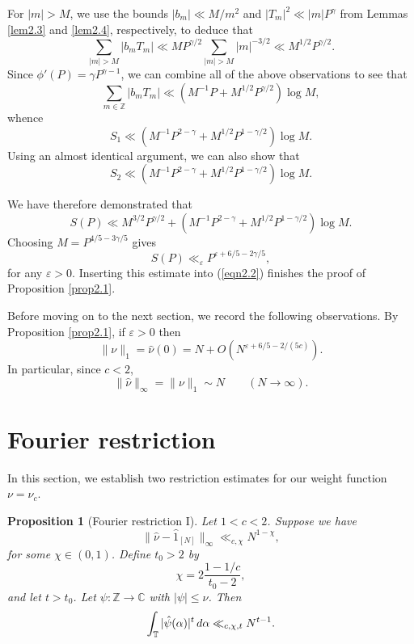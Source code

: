 \documentclass[12pt, reqno]{amsart}
\newtheorem{prop}[thm]{Proposition}
\theoremstyle{definition}
\theoremstyle{remark}
\numberwithin{equation}{section}
\theoremstyle{definition}
\def\alp{{\alpha}} \def\bfalp{{\boldsymbol \alpha}}
\def\gam{{\gamma}} \def\Gam{{\Gamma}}
\def\eps{\varepsilon}
\def\le{\leqslant} \def\ge{\geqslant} \def\pleq{\preccurlyeq} \def\ple{\prec}
\def\d{{\,{\rm d}}}
\def \bC {\mathbb C}
\def \bZ {\mathbb Z}
\def \bT {\mathbb T}
\begin{document}
For $|m| > M$, we use the bounds $|b_m| \ll M/m^2$ and $|T_m|^2\ll |m|P^{\gamma}$ from Lemmas \ref{lem2.3} and \ref{lem2.4}, respectively, to deduce that
\begin{equation*}
\sum_{|m| > M} |b_m T_m| \ll
M P^{\gam/2} \sum_{|m| > M} |m|^{-3/2} \ll M^{1/2} P^{\gamma/2}.
\end{equation*}
Since $\phi'(P) = \gamma P^{\gamma - 1}$, we can combine all of the above observations to see that
\[
\sum_{m \in \bZ} |b_m T_m| \ll (M^{-1}P + M^{1/2}P^{\gam/2}) \log M,
\]
whence
\begin{equation*}
S_1 \ll
(M^{-1}P^{2-\gamma} + M^{1/2}P^{1-\gamma/2}) \log M.
\end{equation*}
Using an almost identical argument, we can also show that
\begin{equation*}
S_2 \ll (M^{-1}P^{2-\gamma} + M^{1/2} P^{1-\gamma/2}) \log M.
\end{equation*}

We have therefore demonstrated that
\begin{equation*}
S(P) \ll M^{3/2} P^{\gam/2} + (M^{-1}P^{2-\gamma} + M^{1/2}P^{1-\gamma/2}) \log M.
\end{equation*}
Choosing $M = P^{4/5 - 3\gam/5}$ gives
\begin{equation*}
S(P) \ll_\eps P^{\eps + 6/5 - 2\gam/5}, 
\end{equation*}
for any $\eps > 0$. Inserting this estimate into (\ref{eqn2.2}) finishes the proof of Proposition \ref{prop2.1}.

\bigskip

Before moving on to the next section, we record the following observations. By Proposition \ref{prop2.1}, if $\eps > 0$ then
\[
\| \nu \|_1 = \hat \nu(0) = N + O(N^{\eps + 6/5 - 2/(5c)}).
\]
In particular, since $c < 2$,
\begin{equation}
\label{eqn2.3}
\| \hat \nu \|_\infty =
\| \nu \|_1 \sim N \qquad (N \to \infty).
\end{equation}

\section{Fourier restriction}
\label{sec3}

In this section, we establish two restriction estimates for our weight function $\nu=\nu_c$.

\begin{prop}
[Fourier restriction I]
\label{prop3.1}
Let $1 < c < 2$.
Suppose we have
\begin{equation}
\label{eqn3.1}
\| \hat \nu - \hat 1_{[N]} \|_\infty \ll_{c,\chi} N^{1-\chi},
\end{equation}
for some $\chi \in (0,1)$. Define $t_0 > 2$ by
\begin{equation}
\label{eqn3.2}
\chi = 2\frac{1-1/c}{t_0 - 2},
\end{equation}
and let $t > t_0$. Let $\psi: \bZ \to \bC$ with $|\psi| \le \nu$. Then
\begin{equation}
\label{eqn3.3}
\int_\bT |\hat \psi(\alp)|^t \d \alp
\ll_{c,\chi,t} N^{t-1}.
\end{equation}
\end{prop}
\end{document}
